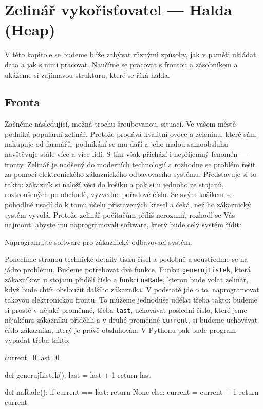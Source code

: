 \ifx\ucebnice\undefined

\fi
\section{Zelinář vykořisťovatel --- Halda (Heap)}

V této kapitole se budeme blíže zabývat různými způsoby, jak v paměti ukládat data a jak s nimi pracovat. Naučíme se
pracovat s frontou a zásobníkem a ukážeme si zajímavou strukturu, které se říká halda. 

\subsection*{Fronta} 

Začněme následující, možná trochu šroubovanou, situací. Ve vašem městě podniká populární zelinář. Protože prodává kvalitní ovoce a zeleninu, 
které sám nakupuje od farmářů, podnikání se mu daří a jeho malou samoobsluhu navštěvuje stále více a více lidí. S tím však 
přichází i nepříjemný fenomén --- fronty. Zelinář je nadšený do moderních technologií a rozhodne se problém řešit za pomoci
elektronického zákaznického odbavovacího systému. Představuje si to takto: zákazník si naloží věci do košíku a pak si u jednoho ze stojanů,
roztroušených po obchodě, vyzvedne pořadové číslo. Se svým košíkem se pohodlně usadí do k tomu účelu přistavených
křesel a čeká, než ho zákaznický systém vyvolá. Protože zelinář počítačům příliš nerozumí, rozhodl se Vás najmout, abyste
mu naprogramovali software, který bude celý systém řídit:

\begin{question} Naprogramujte software pro zákaznický odbavovací systém.
\end{question}

Ponechme stranou technické detaily tisku čísel a podobně a soustřeďme se na jádro problému. Budeme potřebovat dvě funkce. Funkci
{\tt generujListek}, která zákazníkovi u stojanu přidělí číslo a funkci {\tt naRade}, kterou bude volat zelinář, když bude chtít
obsloužit dalšího zákazníka. V podstatě jde o to, naprogramovat takovou elektronickou frontu. To můžeme jednoduše udělat třeba
takto: budeme si prostě v nějaké proměnné, třeba {\tt last},  uchovávat poslední číslo, které jsme nějakému zákazníku přidělili a v druhé
proměnné {\tt current}, si budeme uchovávat číslo zákazníka, který je právě obsluhován. V Pythonu pak bude program vypadat třeba
takto:

\begin{python}
current=0
last=0

def generujListek():
    last = last + 1
    return last
    
def naRade():
    if current == last:
        return None
    else:
        current = current + 1
    return current
\end{python}

